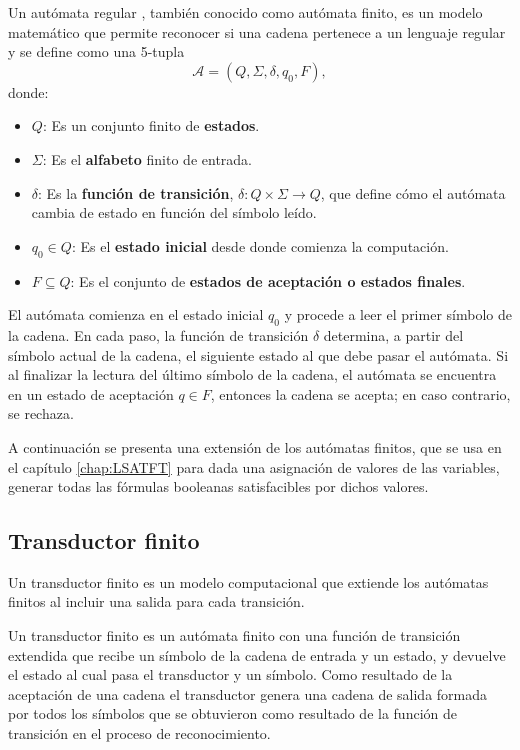 Un autómata regular \cite{authomataTheory}, también conocido como autómata finito, es un modelo matemático que permite reconocer si una cadena pertenece a un lenguaje regular y se define como una 5-tupla $$\mathcal{A} = (Q, \Sigma, \delta, q_0, F),$$ donde:

\begin{itemize}
  \item $Q$: Es un conjunto finito de \textbf{estados}.
  \item $\Sigma$: Es el \textbf{alfabeto} finito de entrada.
  \item $\delta$: Es la \textbf{función de transición}, $\delta: Q \times \Sigma \to Q$, que define cómo el autómata cambia de estado en función del símbolo leído.
  \item $q_0 \in Q$: Es el \textbf{estado inicial} desde donde comienza la computación.
  \item $F \subseteq Q$: Es el conjunto de \textbf{estados de aceptación o estados finales}.
\end{itemize}

El autómata comienza en el estado inicial $q_0$ y procede a leer el primer símbolo de la cadena.  En cada paso, la función de transición $\delta$ determina, a partir del símbolo actual de la cadena, el siguiente estado al que debe pasar el autómata.  Si al finalizar la lectura del último símbolo de la cadena, el autómata se encuentra en un estado de aceptación $q \in F$, entonces la cadena se acepta; en caso contrario, se rechaza.

A continuación se presenta una extensión de los autómatas finitos, que se usa en el capítulo \ref{chap:LSATFT} para dada una asignación de valores de las variables, generar todas las fórmulas booleanas satisfacibles por dichos valores.

\subsection{Transductor finito}

Un transductor finito \cite{finite_transducer} es un modelo computacional que extiende los autómatas finitos al incluir una salida para cada transición.

Un transductor finito es un autómata finito con una función de transición extendida que recibe un símbolo de la 
cadena de entrada y un estado, y devuelve el estado al cual pasa el transductor y un símbolo.  Como resultado de 
la aceptación de una cadena el transductor genera una cadena de salida formada por todos los símbolos que se 
obtuvieron como resultado de la función de transición en el proceso de reconocimiento.

